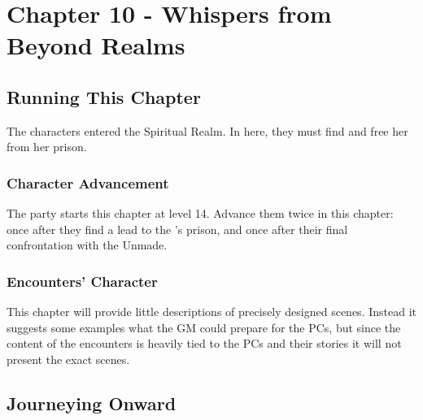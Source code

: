 \chapter{Chapter 10 - Whispers from Beyond Realms}
\label{chap:chapter10}

\setcounter{section}{-1}
\section{Running This Chapter}

The characters entered the Spiritual Realm. In here, they must find \npcMishram{} and free her from her prison.

\subsection{Character Advancement}

The party starts this chapter at level 14. Advance them twice in this chapter: once after they find a lead to the \npcMishram{}'s prison, and once after their final confrontation with the Unmade.


\subsection{Encounters' Character}

This chapter will provide little descriptions of precisely designed scenes. Instead it suggests some examples what the GM could prepare for the PCs, but since the content of the encounters is heavily tied to the PCs and their stories it will not present the exact scenes.







\newpage


\newpage

\newpage

\newpage

\newpage





\newpage



\newpage
\section{Journeying Onward}

